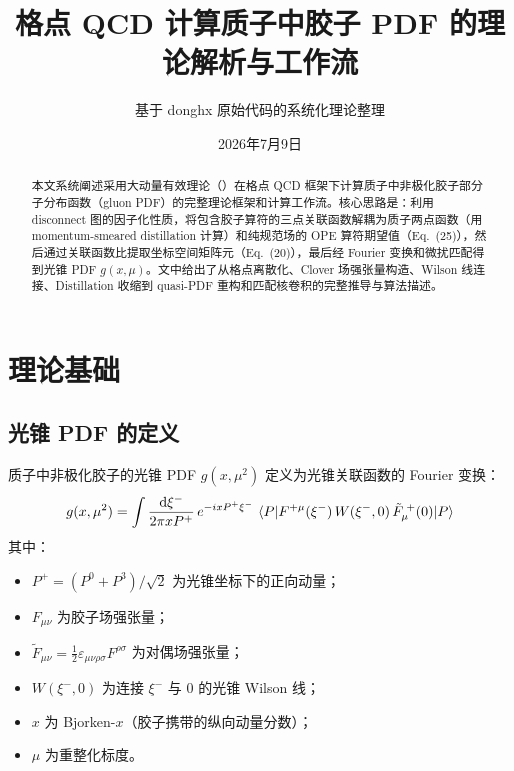 \documentclass[11pt,a4paper]{ctexart}
\title{\textbf{格点 QCD 计算质子中胶子 PDF 的理论解析与工作流}}
\author{基于 donghx 原始代码的系统化理论整理}
\date{2026年7月9日}
\newcommand{\Fmunu}{F_{\mu\nu}}
\newcommand{\Ftmunu}{\tilde{F}_{\mu\nu}}
\newcommand{\eps}{\varepsilon}
\newcommand{\LaMET}{\text{LaMET}}
\begin{document}
\maketitle

\begin{abstract}
\noindent
本文系统阐述采用大动量有效理论（\LaMET）在格点 QCD 框架下计算质子中非极化胶子部分子分布函数（gluon PDF）的完整理论框架和计算工作流。核心思路是：利用 disconnect 图的因子化性质，将包含胶子算符的三点关联函数解耦为质子两点函数（用 momentum-smeared distillation 计算）和纯规范场的 OPE 算符期望值（Eq.~(25)），然后通过关联函数比提取坐标空间矩阵元（Eq.~(20)），最后经 Fourier 变换和微扰匹配得到光锥 PDF $g(x,\mu)$。文中给出了从格点离散化、Clover 场强张量构造、Wilson 线连接、Distillation 收缩到 quasi-PDF 重构和匹配核卷积的完整推导与算法描述。
\end{abstract}

\tableofcontents
\newpage

\section{理论基础}

\subsection{光锥 PDF 的定义}

质子中非极化胶子的光锥 PDF $g(x,\mu^2)$ 定义为光锥关联函数的 Fourier 变换：
\begin{equation}\label{eq:lightcone_pdf}
g(x, \mu^2) = \int \frac{\mathrm{d}\xi^{-}}{2\pi x P^{+}} \,
e^{-i x P^{+}\xi^{-}} \,
\braket{P | F^{+\mu}(\xi^{-}) \, W(\xi^{-}, 0) \, \tilde{F}_{\mu}^{\;+}(0) | P}
\end{equation}
其中：
\begin{itemize}
  \item $P^{+} = (P^{0} + P^{3})/\sqrt{2}$ 为光锥坐标下的正向动量；
  \item $\Fmunu$ 为胶子场强张量；
  \item $\Ftmunu = \tfrac{1}{2}\eps_{\mu\nu\rho\sigma}F^{\rho\sigma}$ 为对偶场强张量；
  \item $W(\xi^{-},0)$ 为连接 $\xi^{-}$ 与 $0$ 的光锥 Wilson 线；
  \item $x$ 为 Bjorken-$x$（胶子携带的纵向动量分数）；
  \item $\mu$ 为重整化标度。
\end{itemize}
\end{document}
